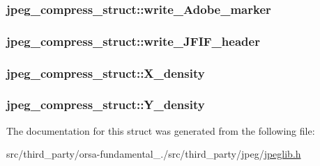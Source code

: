 \subsubsection[{write\+\_\+\+Adobe\+\_\+marker}]{ jpeg\+\_\+compress\+\_\+struct\+::write\+\_\+\+Adobe\+\_\+marker}\label{structjpeg__compress__struct_a39c549a441052b38df2dfd7359c68814}
\hypertarget{structjpeg__compress__struct_a12178443b9177fd4bdddc66ce4e08e12}{}
\subsubsection[{write\+\_\+\+J\+F\+I\+F\+\_\+header}]{ jpeg\+\_\+compress\+\_\+struct\+::write\+\_\+\+J\+F\+I\+F\+\_\+header}\label{structjpeg__compress__struct_a12178443b9177fd4bdddc66ce4e08e12}
\hypertarget{structjpeg__compress__struct_adef3c4b809ebca2a853b5659e177deaa}{}
\subsubsection[{X\+\_\+density}]{ jpeg\+\_\+compress\+\_\+struct\+::\+X\+\_\+density}\label{structjpeg__compress__struct_adef3c4b809ebca2a853b5659e177deaa}
\hypertarget{structjpeg__compress__struct_a978dc1c187fab34211757a134ebf4adb}{}
\subsubsection[{Y\+\_\+density}]{ jpeg\+\_\+compress\+\_\+struct\+::\+Y\+\_\+density}\label{structjpeg__compress__struct_a978dc1c187fab34211757a134ebf4adb}


The documentation for this struct was generated from the following file\+:\begin{DoxyCompactItemize}
\item 
src/third\+\_\+party/orsa-\/fundamental\+\_./src/third\+\_\+party/jpeg/\hyperlink{jpeglib_8h}{jpeglib.\+h}\end{DoxyCompactItemize}
